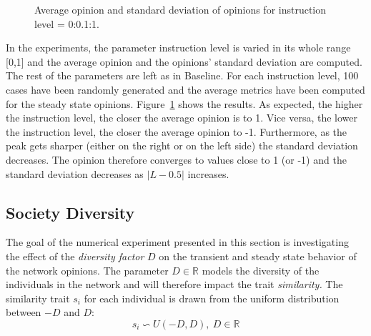 \begin{figure}[!t]
	\centering
	\hfill
	\par 
	\caption{Average opinion and standard deviation of opinions for instruction level = 0:0.1:1.}
	\label{pics:critstatistics}
\end{figure}

In the experiments, the parameter instruction level is varied in its whole range [0,1] and the average opinion and the opinions' standard deviation are computed. The rest of the parameters are left as in Baseline. For each instruction level, 100 cases have been randomly generated and the average metrics have been computed for the steady state opinions.
Figure~\ref{pics:critstatistics} shows the results. As expected, the higher the instruction level, the closer the average opinion is to 1. Vice versa, the lower the instruction level, the closer the average opinion to -1. Furthermore, as the peak gets sharper (either on the right or on the left side) the standard deviation decreases. The opinion therefore converges to values close to 1 (or -1) and the standard deviation decreases as $|L-0.5|$ increases. 
\subsection{Society Diversity}
\label{sec:diversity}
The goal of the numerical experiment presented in this section is investigating the effect of the \textit{diversity factor} $D$ on the transient and steady state behavior of the network opinions. The parameter $D \in \mathbb{R}$ models the diversity of the individuals in the network and will therefore impact the trait \textit{similarity.}
The similarity trait $s_i$ for each individual is drawn from the uniform distribution between $-D$ and $D$:
$$
s_i \backsim U(-D, D),\ D \in \mathbb{R}
$$

